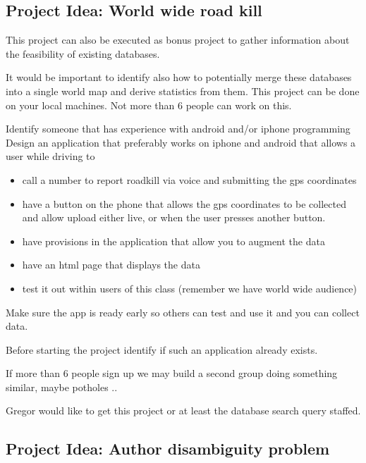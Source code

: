 \subsection{Project Idea: World wide road
kill}\label{project-idea-world-wide-road-kill}

This project can also be executed as bonus project to gather information
about the feasibility of existing databases.

It would be important to identify also how to potentially merge these
databases into a single world map and derive statistics from them. This
project can be done on your local machines. Not more than 6 people can
work on this.

Identify someone that has experience with android and/or iphone
programming Design an application that preferably works on iphone and
android that allows a user while driving to

\begin{itemize}

\item
  call a number to report roadkill via voice and submitting the gps
  coordinates
\item
  have a button on the phone that allows the gps coordinates to be
  collected and allow upload either live, or when the user presses
  another button.
\item
  have provisions in the application that allow you to augment the data
\item
  have an html page that displays the data
\item
  test it out within users of this class (remember we have world wide
  audience)
\end{itemize}

Make sure the app is ready early so others can test and use it and you
can collect data.

Before starting the project identify if such an application already
exists.

If more than 6 people sign up we may build a second group doing
something similar, maybe potholes ..

Gregor would like to get this project or at least the database search
query staffed.

\subsection{Project Idea: Author disambiguity
problem}\label{project-idea-author-disambiguity-problem}

